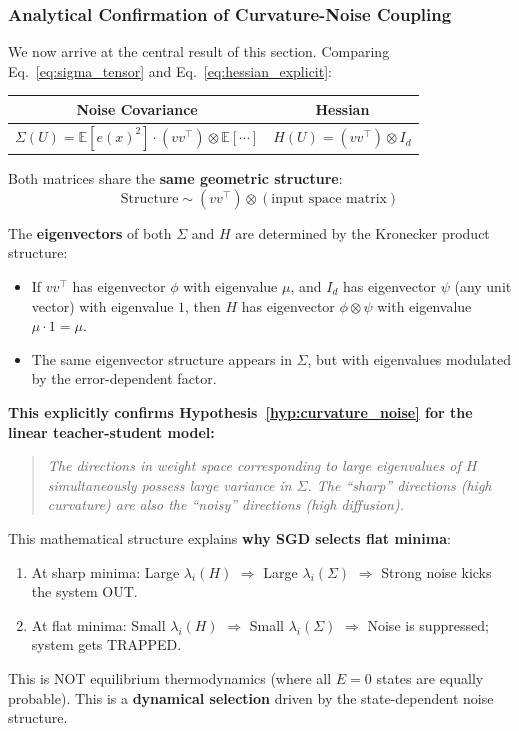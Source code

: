\documentclass[
  journal=largetwo,
  year=2025,
  volume=37,
]{cup-journal}
\begin{document}
\subsubsection{Analytical Confirmation of Curvature-Noise Coupling}

We now arrive at the central result of this section. Comparing Eq.~\eqref{eq:sigma_tensor} and Eq.~\eqref{eq:hessian_explicit}:

\begin{center}
\begin{tabular}{|c|c|}
\hline
\textbf{Noise Covariance} & \textbf{Hessian} \\
\hline
$\Sigma(U) = \mathbb{E}[e(x)^2] \cdot (v v^\top) \otimes \mathbb{E}[\cdots]$ & $H(U) = (v v^\top) \otimes I_d$ \\
\hline
\end{tabular}
\end{center}

Both matrices share the \textbf{same geometric structure}:
\begin{equation}
    \text{Structure} \sim (v v^\top) \otimes (\text{input space matrix})
\end{equation}

The \textbf{eigenvectors} of both $\Sigma$ and $H$ are determined by the Kronecker product structure:
\begin{itemize}
    \item If $v v^\top$ has eigenvector $\phi$ with eigenvalue $\mu$, and $I_d$ has eigenvector $\psi$ (any unit vector) with eigenvalue $1$, then $H$ has eigenvector $\phi \otimes \psi$ with eigenvalue $\mu \cdot 1 = \mu$.
    \item The same eigenvector structure appears in $\Sigma$, but with eigenvalues modulated by the error-dependent factor.
\end{itemize}

\textbf{This explicitly confirms Hypothesis~\ref{hyp:curvature_noise} for the linear teacher-student model:}

\begin{quote}
    \textit{The directions in weight space corresponding to large eigenvalues of $H$ simultaneously possess large variance in $\Sigma$. The ``sharp'' directions (high curvature) are also the ``noisy'' directions (high diffusion).}
\end{quote}

\begin{remark}
This mathematical structure explains \textbf{why SGD selects flat minima}:
\begin{enumerate}
    \item At sharp minima: Large $\lambda_i(H)$ $\Rightarrow$ Large $\lambda_i(\Sigma)$ $\Rightarrow$ Strong noise kicks the system OUT.
    \item At flat minima: Small $\lambda_i(H)$ $\Rightarrow$ Small $\lambda_i(\Sigma)$ $\Rightarrow$ Noise is suppressed; system gets TRAPPED.
\end{enumerate}
This is NOT equilibrium thermodynamics (where all $E=0$ states are equally probable). This is a \textbf{dynamical selection} driven by the state-dependent noise structure.
\end{remark}
\end{document}
